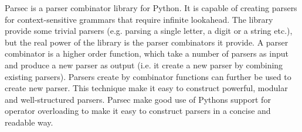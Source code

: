 Parsec is a parser combinator library for Python. It is capable of creating parsers for context-sensitive grammars that require infinite lookahead. The library provide some trivial parsers (e.g. parsing a single letter, a digit or a string etc.), but the real power of the library is the parser combinators it provide. A parser combinator is a higher order function, which take a number of parsers as input and produce a new parser as output (i.e. it create a new parser by combining existing parsers). Parsers create by combinator functions can further be used to create new parser. This technique make it easy to construct powerful, modular and well-structured parsers. Parsec make good use of Pythons support for operator overloading to make it easy to construct parsers in a concise and readable way. 



